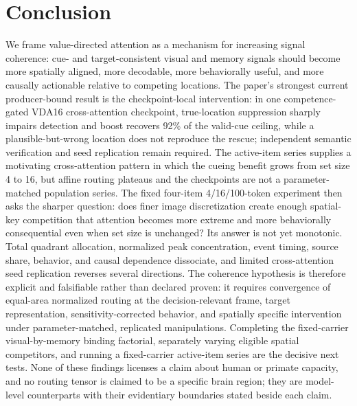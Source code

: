 \documentclass[10pt]{article}
\begin{document}
\FloatBarrier
\section{Conclusion}
We frame value-directed attention as a mechanism for increasing signal coherence: cue- and target-consistent visual and memory signals should become more spatially aligned, more decodable, more behaviorally useful, and more causally actionable relative to competing locations. The paper's strongest current producer-bound result is the checkpoint-local intervention: in one competence-gated VDA16 cross-attention checkpoint, true-location suppression sharply impairs detection and boost recovers 92\% of the valid-cue ceiling, while a plausible-but-wrong location does not reproduce the rescue; independent semantic verification and seed replication remain required. The active-item series supplies a motivating cross-attention pattern in which the cueing benefit grows from set size 4 to 16, but affine routing plateaus and the checkpoints are not a parameter-matched population series. The fixed four-item 4/16/100-token experiment then asks the sharper question: does finer image discretization create enough spatial-key competition that attention becomes more extreme and more behaviorally consequential even when set size is unchanged? Its answer is not yet monotonic. Total quadrant allocation, normalized peak concentration, event timing, source share, behavior, and causal dependence dissociate, and limited cross-attention seed replication reverses several directions. The coherence hypothesis is therefore explicit and falsifiable rather than declared proven: it requires convergence of equal-area normalized routing at the decision-relevant frame, target representation, sensitivity-corrected behavior, and spatially specific intervention under parameter-matched, replicated manipulations. Completing the fixed-carrier visual-by-memory binding factorial, separately varying eligible spatial competitors, and running a fixed-carrier active-item series are the decisive next tests. None of these findings licenses a claim about human or primate capacity, and no routing tensor is claimed to be a specific brain region; they are model-level counterparts with their evidentiary boundaries stated beside each claim.
\end{document}
